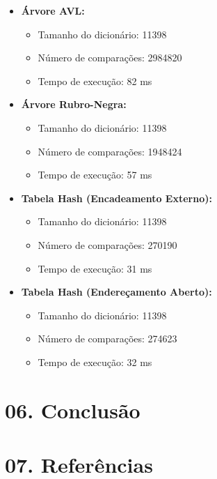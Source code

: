 \documentclass{article}
\begin{document}
\begin{itemize}
    \item \textbf{Árvore AVL:}
    \begin{itemize}
        \item Tamanho do dicionário: 11398
        \item Número de comparações: 2984820
        \item Tempo de execução: 82 ms
    \end{itemize}
    
    \item \textbf{Árvore Rubro-Negra:}
    \begin{itemize}
        \item Tamanho do dicionário: 11398
        \item Número de comparações: 1948424
        \item Tempo de execução: 57 ms
    \end{itemize}
    
    \item \textbf{Tabela Hash (Encadeamento Externo):}
    \begin{itemize}
        \item Tamanho do dicionário: 11398
        \item Número de comparações: 270190
        \item Tempo de execução: 31 ms
    \end{itemize}
    
    \item \textbf{Tabela Hash (Endereçamento Aberto):}
    \begin{itemize}
        \item Tamanho do dicionário: 11398
        \item Número de comparações: 274623
        \item Tempo de execução: 32 ms
    \end{itemize}
\end{itemize}

\section*{06. Conclusão}

\section*{07. Referências}
\end{document}
